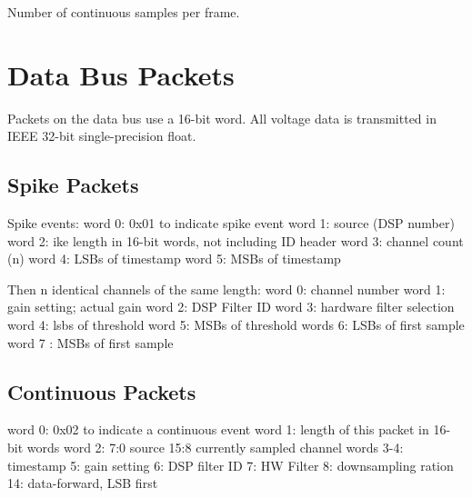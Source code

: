 Number of continuous samples per frame.


\section{Data Bus Packets}
Packets on the data bus use a 16-bit word. All voltage data is transmitted in IEEE 32-bit single-precision float. 


\subsection{Spike Packets}
Spike events:
word 0: 0x01 to indicate spike event
word 1: source (DSP number)
word 2: ike length in 16-bit words, not including ID header
word 3: channel count (n)
word 4: LSBs of timestamp
word 5: MSBs of timestamp

Then n identical channels of the same length:
word 0: channel number
word 1: gain setting; actual gain
word 2: DSP Filter ID
word 3: hardware filter selection
word 4: lsbs of threshold
word 5: MSBs of threshold
words 6: LSBs of first sample
word 7 : MSBs of first sample

\subsection{Continuous Packets}
word 0: 0x02 to indicate a continuous event
word 1: length of this packet in 16-bit words
word 2: 
   7:0 source
  15:8 currently sampled channel
words 3-4: timestamp
5: gain setting
6: DSP filter ID
7: HW Filter
8: downsampling ration
14: data-forward, LSB first



